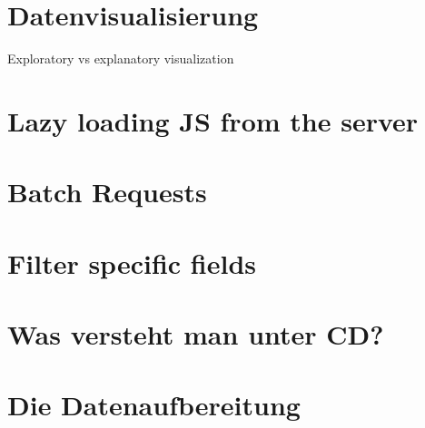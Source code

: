 \section{Datenvisualisierung}
Exploratory vs explanatory visualization



\section{Lazy loading JS from the server}


\section{Batch Requests}

\section{Filter specific fields}

\section{Was versteht man unter CD?}
\label{sec:was-versteht-man-unter-cd}

\section{Die Datenaufbereitung}
